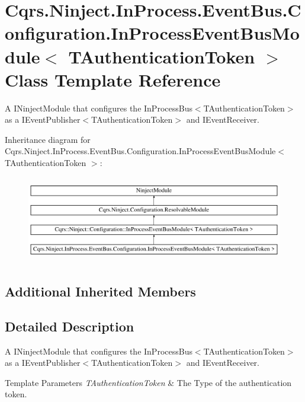 \hypertarget{classCqrs_1_1Ninject_1_1InProcess_1_1EventBus_1_1Configuration_1_1InProcessEventBusModule}{}\section{Cqrs.\+Ninject.\+In\+Process.\+Event\+Bus.\+Configuration.\+In\+Process\+Event\+Bus\+Module$<$ T\+Authentication\+Token $>$ Class Template Reference}
\label{classCqrs_1_1Ninject_1_1InProcess_1_1EventBus_1_1Configuration_1_1InProcessEventBusModule}


A I\+Ninject\+Module that configures the In\+Process\+Bus$<$\+T\+Authentication\+Token$>$ as a I\+Event\+Publisher$<$\+T\+Authentication\+Token$>$ and I\+Event\+Receiver.  


Inheritance diagram for Cqrs.\+Ninject.\+In\+Process.\+Event\+Bus.\+Configuration.\+In\+Process\+Event\+Bus\+Module$<$ T\+Authentication\+Token $>$\+:\begin{figure}[H]
\begin{center}
\leavevmode
\includegraphics[height=3.822526cm]{classCqrs_1_1Ninject_1_1InProcess_1_1EventBus_1_1Configuration_1_1InProcessEventBusModule}
\end{center}
\end{figure}
\subsection*{Additional Inherited Members}


\subsection{Detailed Description}
A I\+Ninject\+Module that configures the In\+Process\+Bus$<$\+T\+Authentication\+Token$>$ as a I\+Event\+Publisher$<$\+T\+Authentication\+Token$>$ and I\+Event\+Receiver. 


\begin{DoxyTemplParams}{Template Parameters}
{\em T\+Authentication\+Token} & The Type of the authentication token.\\
\hline
\end{DoxyTemplParams}
